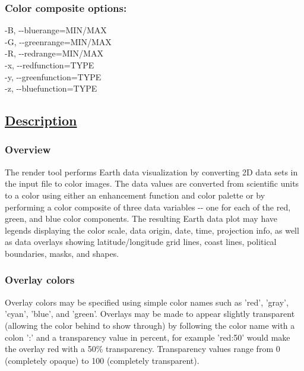 \subsubsection*{Color composite options:}


  -B, -{-}bluerange=MIN/MAX \\ 
 -G, -{-}greenrange=MIN/MAX \\ 
 -R, -{-}redrange=MIN/MAX \\ 
 -x, -{-}redfunction=TYPE \\ 
 -y, -{-}greenfunction=TYPE \\ 
 -z, -{-}bluefunction=TYPE 
\subsection*{\underline{Description}}
\subsubsection*{Overview}


 The render tool performs Earth data visualization by converting 2D data sets in the input file to color images. The data values are converted from scientific units to a color using either an enhancement function and color palette or by performing a color composite of three data variables -{-} one for each of the red, green, and blue color components. The resulting Earth data plot may have legends displaying the color scale, data origin, date, time, projection info, as well as data overlays showing latitude/longitude grid lines, coast lines, political boundaries, masks, and shapes.
\subsubsection*{Overlay colors}


 Overlay colors may be specified using simple color names such as 'red', 'gray', 'cyan', 'blue', and 'green'. Overlays may be made to appear slightly transparent (allowing the color behind to show through) by following the color name with a colon ':' and a transparency value in percent, for example 'red:50' would make the overlay red with a 50\% transparency. Transparency values range from 0 (completely opaque) to 100 (completely transparent).


